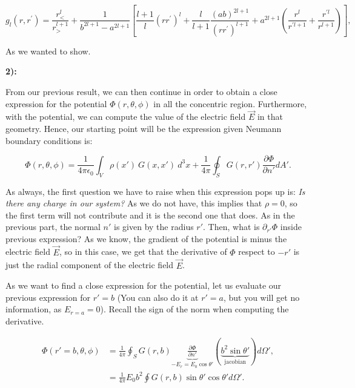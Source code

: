 \begin{equation}\label{eq:radialpart2}
	g_{l}\left(r, r^{\prime}\right)=\frac{r_{<}^{l}}{r_{>}^{l+1}}+\frac{1}{b^{2 l+1}-a^{2 l+1}}\left[\frac{l+1}{l}\left(r r^{\prime}\right)^{l}+\frac{l}{l+1} \frac{(a b)^{2 l+1}}{\left(r r^{\prime}\right)^{l+1}}+a^{2 l+1}\left(\frac{r^{l}}{r^{\prime l+1}}+\frac{r^{\prime l}}{r^{l+1}}\right)\right],
\end{equation}
	
As we wanted to show.
	
	
\textbf{2):}

From our previous result, we can then continue in order to obtain a close expression for the potential $\Phi(r,\theta,\phi)$ in all the concentric region. Furthermore, with the potential, we can compute the value of the electric field $\vec{E}$ in that geometry. Hence, our starting point will be the expression given Neumann boundary conditions is:
	
\begin{equation}
	\Phi(r,\theta, \phi) = \frac{1}{4 \pi \epsilon_{0}} \int_{V} \rho(x')\: G(x,x') \:d^{3} x + \frac{1}{4 \pi} \oint_{S} G(r,r') \frac{\partial \Phi}{\partial n'} d A' .
\end{equation}

As always, the first question we have to raise when this expression pops up is: \textit{Is there any charge in our system?} As we do not have, this implies that $\rho =0$, so the first term will not contribute and it is the second one that does. As in the previous part, the normal $n'$ is given by the radius $r'$. Then, what is $\partial_{r'} \Phi$ inside previous expression? As we know, the gradient of the potential is minus the electric field $\vec{E}$, so in this case, we get that the derivative of $\Phi$ respect to $-r'$ is just the radial component of the electric field $\vec{E}$.
	
As we want to find a close expression for the potential, let us evaluate our previous expression for $r'=b$ (You can also do it at $r'=a$, but you will get no information, as $E_{r=a} =0$). Recall the sign of the norm when computing the derivative.
	
\begin{equation}
	\begin{split}
		\Phi(r'=b, \theta, \phi) &= \frac{1}{4\pi} \oint_{S} G(r,b) \underbrace{\frac{\partial \Phi}{\partial n'}}_{-E_{r} = E_{0} \cos \theta'}  \left(\underbrace{b^{2} \sin \theta'}_{\text{jacobian}}\right) d \Omega', \\
		&= \frac{1}{4\pi} E_{0} b^{2} \oint G(r,b) \sin \theta' \cos \theta' d \Omega'.
	\end{split}
\end{equation}

